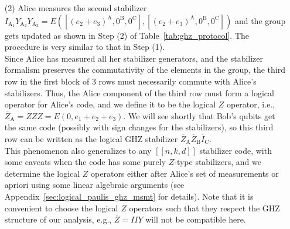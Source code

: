 \documentclass[journal,onecolumn]{IEEEtran}
\newcommand{\llbr}{[\![}
\newcommand{\rrbr}{]\!]}
\begin{document}
\begin{enumerate}
\item[(2)] Alice measures the second stabilizer $I_{\text{A}_1} Y_{\text{A}_2} Y_{\text{A}_3} = E([(e_2+e_3)^{\text{A}},0^{\text{B}},0^{\text{C}}],[(e_2+e_3)^{\text{A}},0^{\text{B}},0^{\text{C}}])$ and the group gets updated as shown in Step (2) of Table~\ref{tab:ghz_protocol}. %
The procedure is very similar to that in Step (1). \\

Since Alice has measured all her stabilizer generators, and the stabilizer formalism preserves the commutativity of the elements in the group, the third row in the first block of 3 rows must necessarily commute with Alice's stabilizers.
Thus, the Alice component of the third row must form a logical operator for Alice's code, and we define it to be the logical $Z$ operator, i.e., $\overline{Z}_{\text{A}} = ZZZ = E(0,e_1+e_2+e_3)$.
We will see shortly that Bob's qubits get the same code (possibly with sign changes for the stabilizers), so this third row can be written as the logical GHZ stabilizer $\overline{Z}_{\text{A}} \overline{Z}_{\text{B}} \overline{I}_{\text{C}}$. \\

This phenomenon also generalizes to any $\llbr n,k,d \rrbr$ stabilizer code, with some caveats when the code has some purely $Z$-type stabilizers, and we determine the logical $Z$ operators either after Alice's set of measurements or apriori using some linear algebraic arguments (see Appendix~\ref{sec:logical_paulis_ghz_msmt} for details).
Note that it is convenient to choose the logical $Z$ operators such that they respect the GHZ structure of our analysis, e.g., $\overline{Z} = IIY$ will not be compatible here. \\



\end{enumerate}
\end{document}
